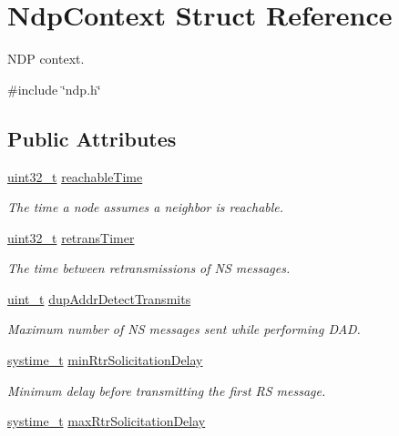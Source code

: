 \hypertarget{structNdpContext}{}\section{Ndp\+Context Struct Reference}
\label{structNdpContext}


N\+DP context.  




{\ttfamily \#include \char`\"{}ndp.\+h\char`\"{}}

\subsection*{Public Attributes}
\begin{DoxyCompactItemize}
\item 
\hyperlink{stdint_8h_a435d1572bf3f880d55459d9805097f62}{uint32\+\_\+t} \hyperlink{structNdpContext_a572ac8209cafbc1f41949fa4031173fc}{reachable\+Time}
\begin{DoxyCompactList}\small\item\em The time a node assumes a neighbor is reachable. \end{DoxyCompactList}\item 
\hyperlink{stdint_8h_a435d1572bf3f880d55459d9805097f62}{uint32\+\_\+t} \hyperlink{structNdpContext_a529caf9017efd6a9e5b9e546a9a0c012}{retrans\+Timer}
\begin{DoxyCompactList}\small\item\em The time between retransmissions of NS messages. \end{DoxyCompactList}\item 
\hyperlink{compiler__port_8h_a12a1e9b3ce141648783a82445d02b58d}{uint\+\_\+t} \hyperlink{structNdpContext_a47458438d295650512e889531b1e0471}{dup\+Addr\+Detect\+Transmits}
\begin{DoxyCompactList}\small\item\em Maximum number of NS messages sent while performing D\+AD. \end{DoxyCompactList}\item 
\hyperlink{compiler__port_8h_ae3e32a98d431a02106616da3071832dd}{systime\+\_\+t} \hyperlink{structNdpContext_a79e43c50b5147074a654da9c242008d3}{min\+Rtr\+Solicitation\+Delay}
\begin{DoxyCompactList}\small\item\em Minimum delay before transmitting the first RS message. \end{DoxyCompactList}\item 
\hyperlink{compiler__port_8h_ae3e32a98d431a02106616da3071832dd}{systime\+\_\+t} \hyperlink{structNdpContext_a5f21cd7b9fe8e523cd7b01d6274cb11c}{max\+Rtr\+Solicitation\+Delay}

\end{DoxyCompactItemize}
